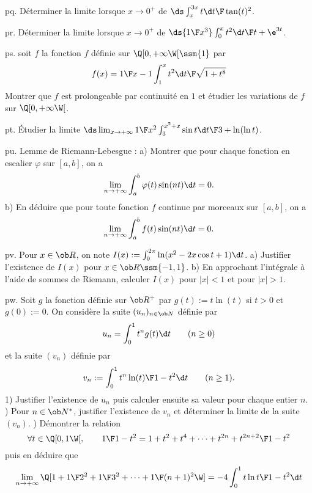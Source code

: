 \exo [Level=1,Fight=2,Learn=2,Field=\FonctionsDéfiniesParUneIntégrale,Type=\Exercices,Origin=] pq. 
Déterminer la limite lorsque $x\to0^+$ de $\ds\int_x^{3x}{t\d t\F \tan(t)^2}$. 

\exo [Level=1,Fight=2,Learn=2,Field=\FonctionsDéfiniesParUneIntégrale,Type=\Exercices,Origin=] pr. 
Déterminer la limite lorsque $x\to0^+$ de $\ds {1\F x^3}\int_0^x{t^2\d t\F t+\e^{3t}}$. 

\exo [Level=1,Fight=2,Learn=2,Field=\FonctionsDéfiniesParUneIntégrale,Type=\Exercices,Origin=] ps. 
soit $f$ la fonction $f$ définie sur $\Q[0,+\infty\W[\ssm\{1\}$ par 
$$
f(x)={1\F x-1}\int_1^x{t^2\d t\F\sqrt{1+t^8}}
$$
Montrer que $f$ est prolongeable par continuité en $1$ et étudier les variations de $f$ sur $\Q[0,+\infty\W[$. 

\exo [Level=1,Fight=2,Learn=2,Field=\Intégration,Type=\Exercices,Origin=,Indication={On pourras scinder l'intégrale en deux et utiliser la formule de la moyenne.}] pt. 
Étudier la limite $\ds\lim_{x\to+\infty}{1\F x^2}\int_3^{x^2+x}{\sin t\d t\F 3+\ln(\ln t)}$. \pn



\exo [Level=1,Fight=2,Learn=2,Field=\Intégration,Type=\Exercices,Origin=] pu. 
Lemme de Riemann-Lebesgue : \pn
a) Montrer que pour chaque fonction en escalier $\varphi$ sur $[a,b]$, on a 
$$
\lim_{n\to+\infty}\int_a^b\varphi(t)\sin(nt)\d t=0.
$$
b) En déduire que pour toute fonction $f$ continue par morceaux sur $[a,b]$, on a 
$$
\lim_{n\to+\infty}\int_a^bf(t)\sin(nt)\d t=0.
$$

\exo [Level=1,Fight=2,Learn=2,Field=\FonctionsDéfiniesParUneIntégrale,Type=\Exercices,Origin=] pv. 
Pour $x\in\ob R$, on note $I(x):=\int_0^{2\pi}\ln(x^2-2x\cos t+1)\d t$. \pn
a) Justifier l'existence de $I(x)$ pour $x\in\ob R\ssm\{-1,1\}$. \pn
b) En approchant l'intégrale à l'aide de sommes de Riemann, calculer $I(x)$ pour $|x|<1$ et pour $|x|>1$.  

\exo [Level=1,Fight=2,Learn=2,Field=\FonctionsDéfiniesParUneIntégrale,Type=\Exercices,Origin=,Indication={2) On pourra introduire la fonction $\ds t\mapsto {t\ln t\F 1-t^2}$.}] pw. 
Soit $g$ la fonction définie sur $\ob R^+$ par $g(t):=t\ln(t)$ si $t>0$ et $g(0):=0$. On considère la suite $(u_n)_{n\in\ob N}$ définie par 
$$
u_n=\int_0^1t^ng(t)\d t\qquad(n\ge0)
$$
et la suite $(v_n)$ définie par 
$$
v_n:=\int_0^1{t^n\ln(t)\F1-t^2}\d t\qquad(n\ge1).
$$
1) Justifier l'existence de $u_n$ puis calculer ensuite sa valeur pour chaque entier $n$. ) Pour $n\in\ob N^*$, justifier l'existence de $v_n$ et déterminer la limite de la suite $(v_n)$. ) Démontrer la relation 
$$
\forall t\in\Q[0,1\W[,\qquad {1\F1-t^2}=1+t^2+t^4+\cdots+t^{2n}+{t^{2n+2}\F 1-t^2}
$$
puis en déduire que 
$$
\lim_{n\to+\infty}\Q[1+{1\F 2^2}+{1\F 3^2}+\cdots+{1\F (n+1)^2}\W]=-4\int_0^1{t\ln t\F 1-t^2}\d t
$$

